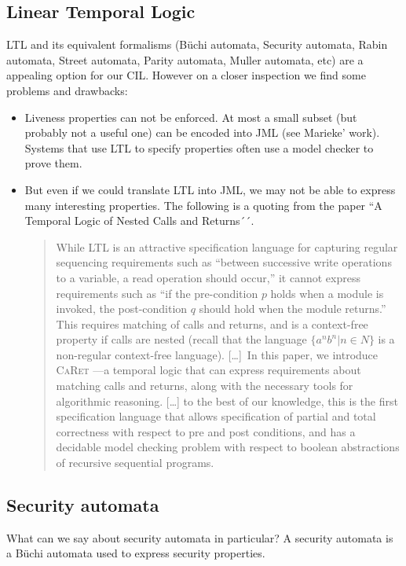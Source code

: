 \documentclass[a4paper,10pt]{article}
\begin{document}
\subsection*{Linear Temporal Logic}
LTL and its equivalent formalisms (B\"uchi automata, Security automata, Rabin
automata, Street automata, Parity automata, Muller automata, etc) are a
appealing option for our CIL. However on a closer inspection we find some
problems and drawbacks:
\begin{itemize}
  \item Liveness properties can not be enforced. At most a small subset (but
probably not a useful one) can be encoded into JML (see Marieke' work). Systems
that use LTL to specify properties often use a model checker to prove them.
  \item But even if we could translate LTL into JML, we may not be able to
express many interesting properties. The following is a quoting from the paper
``A Temporal Logic of Nested Calls and Returns´´.
\begin{quote}
While LTL is an attractive specification language for capturing regular
sequencing requirements such as ``between successive write operations to a
variable, a read operation should occur,'' it cannot express requirements such
as ``if the pre-condition $p$ holds when a module is invoked, the post-condition
$q$ should hold when the module returns.'' This requires matching of calls and
returns, and is a context-free property if calls are nested (recall that the
language $\{a^nb^n | n \in N\}$ is a non-regular context-free language).
[\ldots]\ In this paper, we introduce \textsc{CaRet} ---a temporal logic that
can express requirements about matching calls and returns, along with the
necessary tools for algorithmic reasoning. [\dots] to the best of our knowledge,
this is the first specification language that allows specification of partial
and total correctness with respect to pre and post conditions, and has a
decidable model checking problem with respect to boolean abstractions of
recursive sequential programs.
\end{quote}
\end{itemize}

\subsection*{Security automata}
What can we say about security automata in particular?
A security automata is a B\"uchi automata used to express security properties.
\end{document}
